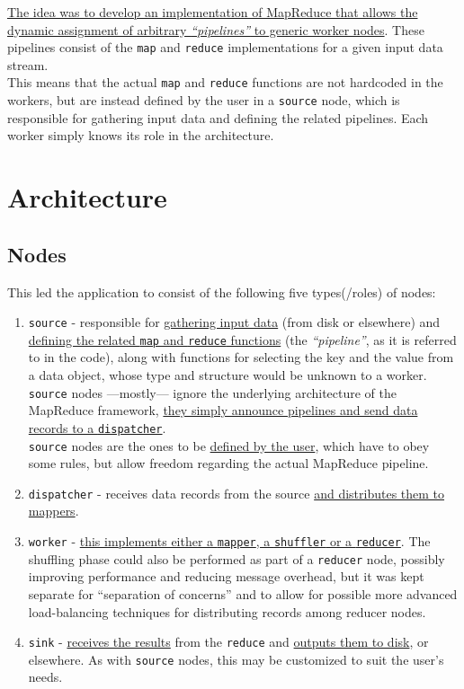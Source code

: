 \ul{The idea was to develop an implementation of MapReduce that allows the dynamic assignment of arbitrary \textit{``pipelines''} to generic worker nodes}. These pipelines consist of the \verb|map| and \verb|reduce| implementations for a given input data stream.\\
This means that the actual \verb|map| and \verb|reduce| functions are not hardcoded in the workers, but are instead defined by the user in a \texttt{source} node, which is responsible for gathering input data and defining the related pipelines.
Each worker simply knows its role in the architecture.

\section{Architecture}

\subsection{Nodes}
{This led the application to consist of the following five types(/roles) of nodes:\ns
\begin{enumerate}
   \item \texttt{source} - responsible for \ul{gathering input data} (from disk or elsewhere) and \ul{defining the related \texttt{map} and \texttt{reduce} functions} (the \textit{``pipeline''}, as it is referred to in the code), along with functions for selecting the key and the value from a data object, whose type and structure would be unknown to a worker.\\
   \texttt{source} nodes ---mostly--- ignore the underlying architecture of the MapReduce framework, \ul{they simply announce pipelines and send data records to a \texttt{dispatcher}}.\\
   \texttt{source} nodes are the ones to be \ul{defined by the user}, which have to obey some rules, but allow freedom regarding the actual MapReduce pipeline.
   \item \texttt{dispatcher} - receives data records from the source \ul{and distributes them to mappers}.
   \item \texttt{worker} - \ul{this implements either a \texttt{mapper}, a \texttt{shuffler} or a \texttt{reducer}}. The shuffling phase could also be performed as part of a \texttt{reducer} node, possibly improving performance and reducing message overhead, but it was kept separate for ``separation of concerns'' and to allow for possible more advanced load-balancing techniques for distributing records among reducer nodes.
   \item \texttt{sink} - \ul{receives the results} from the \texttt{reduce} and \ul{outputs them to disk}, or elsewhere. As with \texttt{source} nodes, this may be customized to suit the user's needs.
\end{enumerate}}

